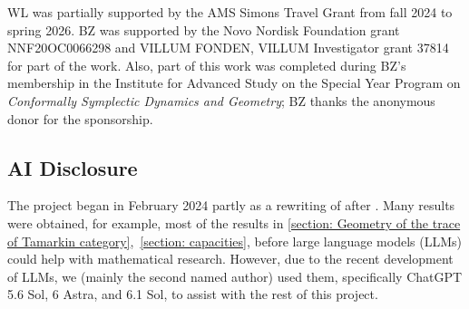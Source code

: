 \documentclass[11pt]{amsart}
\numberwithin{equation}{section}
\theoremstyle{plain}
\theoremstyle{definition}
\theoremstyle{remark}
\begin{document}
WL was partially supported by the AMS Simons Travel Grant from fall 2024 to spring 2026. BZ was supported by the Novo Nordisk Foundation grant NNF20OC0066298 and VILLUM FONDEN, VILLUM Investigator grant 37814 for part of the work. Also, part of this work was completed during BZ's membership in the Institute for Advanced Study on the Special Year Program on\textit{ Conformally Symplectic Dynamics and Geometry}; BZ thanks the anonymous donor for the sponsorship.

\subsection*{AI Disclosure}
The project began in February 2024 partly as a rewriting of \cite{CyclicZHANG} after \cite{Kuo-Li-CY}. Many results were obtained, for example, most of the results in \autoref{section: Geometry of the trace of Tamarkin category},~\ref{section: capacities}, before large language models (LLMs) could help with mathematical research. However, due to the recent development of LLMs, we (mainly the second named author) used them, specifically ChatGPT 5.6 Sol, 6 Astra, and 6.1 Sol, to assist with the rest of this project. 
\end{document}
